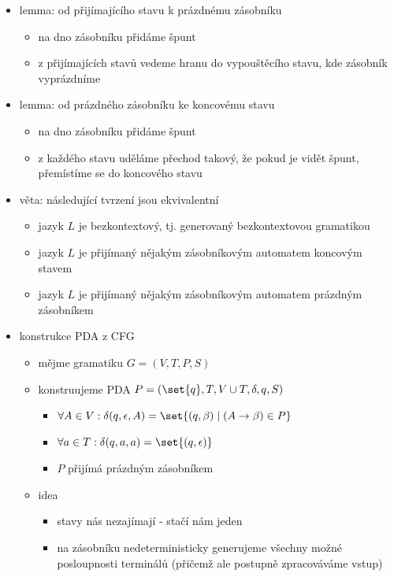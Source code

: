 \begin{itemize}
\begin{itemize}
\begin{itemize}
\end{itemize}
\item lemma: od přijímajícího stavu k prázdnému zásobníku
\begin{itemize}
\item na dno zásobníku přidáme špunt
\item z přijímajících stavů vedeme hranu do vypouštěcího stavu, kde zásobník vyprázdníme
\end{itemize}
\item lemma: od prázdného zásobníku ke koncovému stavu
\begin{itemize}
\item na dno zásobníku přidáme špunt
\item z každého stavu uděláme přechod takový, že pokud je vidět špunt, přemístíme se do koncového stavu
\end{itemize}
\item věta: následující tvrzení jsou ekvivalentní
\begin{itemize}
\item jazyk $L$ je bezkontextový, tj. generovaný bezkontextovou gramatikou
\item jazyk $L$ je přijímaný nějakým zásobníkovým automatem koncovým stavem
\item jazyk $L$ je přijímaný nějakým zásobníkovým automatem prázdným zásobníkem
\end{itemize}
\item konstrukce PDA z CFG
\begin{itemize}
\item mějme gramatiku $G=(V,T,P,S)$
\item konstruujeme PDA $P=(\set{q},T,V\cup T,\delta,q,S)$
\begin{itemize}
\item $\forall A\in V:\delta(q,\epsilon,A)=\set{(q,\beta)\mid (A\to \beta)\in P}$
\item $\forall a\in T:\delta(q,a,a)=\set{(q,\epsilon)}$
\item $P$ přijímá prázdným zásobníkem
\end{itemize}
\item idea
\begin{itemize}
\item stavy nás nezajímají - stačí nám jeden
\item na zásobníku nedeterministicky generujeme všechny možné posloupnosti terminálů (přičemž ale postupně zpracováváme vstup)
\end{itemize}
\end{itemize}

\end{itemize}
\end{itemize}
